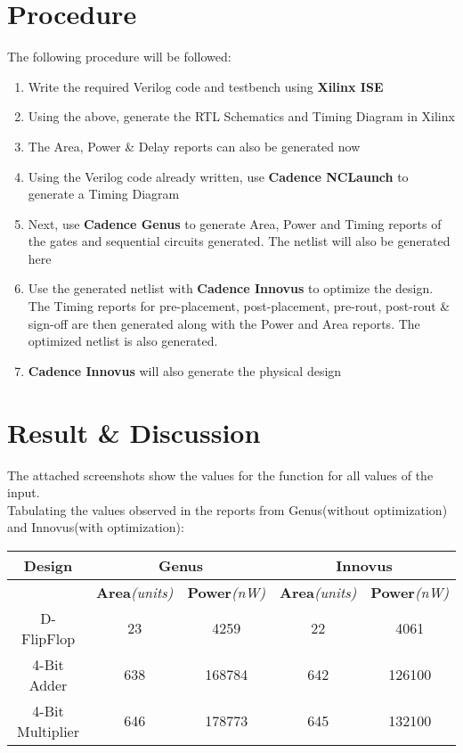 \documentclass[a4paper,10pt]{report}
\begin{document}
\section{Procedure}
The following procedure will be followed:
\begin{enumerate}
	\item Write the required Verilog code and testbench using \textbf{Xilinx ISE}
	\item Using the above, generate the RTL Schematics and Timing Diagram in Xilinx
	\item The Area, Power \& Delay reports can also be generated now
	\item Using the Verilog code already written, use \textbf{Cadence NCLaunch} to generate a Timing Diagram
	\item Next, use \textbf{Cadence Genus} to generate Area, Power and Timing reports of the gates and sequential circuits generated. The netlist will also be generated here
	\item Use the generated netlist with \textbf{Cadence Innovus} to optimize the design. The Timing reports for pre-placement, post-placement, pre-rout, post-rout \& sign-off are then generated along with the Power and Area reports. The optimized netlist is also generated.
	\item \textbf{Cadence Innovus} will also generate the physical design
\end{enumerate}

\section{Result \& Discussion}

The attached screenshots show the values for the function for all values of the input. \\
Tabulating the values observed in the reports from Genus(without optimization) and Innovus(with optimization): \\

\begin{tabular}{|c|c|c|c|c|}
	\hline
	\textbf{Design} & \multicolumn{2}{|c|}{\textbf{Genus}} & \multicolumn{2}{|c|}{\textbf{Innovus}} \\
	\hline
     & \textbf{Area}\textit{(units)} & \textbf{Power}\textit{(nW)} & \textbf{Area}\textit{(units)} & \textbf{Power}\textit{(nW)} \\
     \hline
     D-FlipFlop & 23 & 4259  & 22 & 4061  \\
     \hline
     4-Bit Adder & 638  & 168784 & 642 & 126100 \\
     \hline
     4-Bit Multiplier & 646 & 178773 & 645 & 132100 \\
     \hline

\end{tabular} \\
\\
\end{document}

